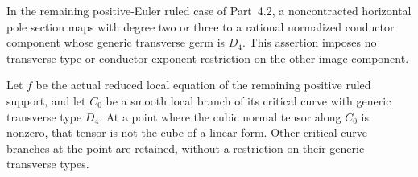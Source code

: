 \begin{proposition}[P4R.18]\hypertarget{tag-02YB}{}\label{night:P4R.18}\label{stmt:P4R.18}


In the remaining positive-Euler ruled case of Part~4.2, a
noncontracted horizontal pole section maps with degree two or
three to a rational normalized conductor component whose generic
transverse germ is $D_4$. This assertion imposes no transverse
type or conductor-exponent restriction on the other image component.
\end{proposition}

\begin{proposition}[P4R.19]\hypertarget{tag-02YC}{}\label{night:P4R.19}\label{stmt:P4R.19}


Let $f$ be the actual reduced local equation of the remaining
positive ruled support, and let $C_0$ be a smooth local branch
of its critical curve with generic transverse type $D_4$.
At a point where the cubic normal tensor along $C_0$ is
nonzero, that tensor is not the cube of a linear form.
Other critical-curve branches at the point are retained,
without a restriction on their generic transverse types.
\end{proposition}

